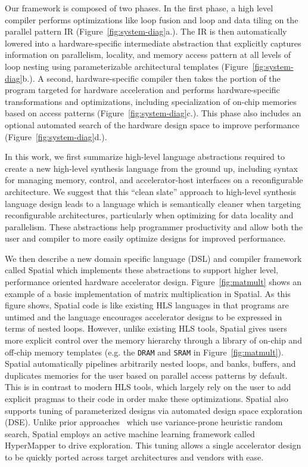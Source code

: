 Our framework is composed of two phases. In the first phase,
a high level compiler performs optimizations like loop fusion and loop and
data tiling on the parallel pattern IR (Figure~\ref{fig:system-diag}a.).
The IR is then automatically lowered into a hardware-specific intermediate
abstraction that explicitly captures information on parallelism,
locality, and memory access pattern at all levels of loop nesting using
parameterizable architectural templates (Figure~\ref{fig:system-diag}b.).
A second, hardware-specific compiler then takes the portion of the program
targeted for hardware acceleration and performs hardware-specific transformations and
optimizations, including specialization of on-chip memories based on access patterns (Figure~\ref{fig:system-diag}c.).
This phase also includes an optional automated search of the hardware design space
to improve performance (Figure~\ref{fig:system-diag}d.).

In this work, we first summarize high-level language abstractions required to create a new high-level synthesis language from the ground up, including syntax for managing memory, control, and accelerator-host interfaces on a reconfigurable architecture.
We suggest that this ``clean slate'' approach to high-level synthesis language design leads to a language which is semantically cleaner when targeting reconfigurable architectures, particularly when optimizing for data locality and parallelism.
These abstractions help programmer productivity and allow both the user and compiler to more easily optimize designs for improved performance.


We then describe a new domain specific language (DSL) and compiler framework called Spatial which implements these abstractions to support higher level, performance oriented hardware accelerator design.
Figure~\ref{fig:matmult} shows an example of a basic implementation of matrix multiplication in Spatial.
As this figure shows, Spatial code is like existing HLS languages in that programs are untimed and the language encourages accelerator designs to be expressed in terms of nested loops. However, unlike existing HLS tools, Spatial gives users more explicit control over the memory hierarchy through a library of on-chip and off-chip memory templates (e.g. the \texttt{DRAM} and \texttt{SRAM} in Figure~\ref{fig:matmult}).
Spatial automatically pipelines arbitrarily nested loops, and banks, buffers, and duplicates memories for the user based on parallel access patterns by default.
This is in contrast to modern HLS tools, which largely rely on the user to add explicit pragmas to their code in order make these optimizations.
Spatial also supports tuning of parameterized designs via automated design space exploration (DSE).
Unlike prior approaches~\cite{dhdl} which use variance-prone heuristic random search, Spatial employs an active machine learning framework called HyperMapper \cite{Bodin2016:PACT16} to drive exploration.
This tuning allows a single accelerator design to be quickly ported across target architectures and vendors with ease.

